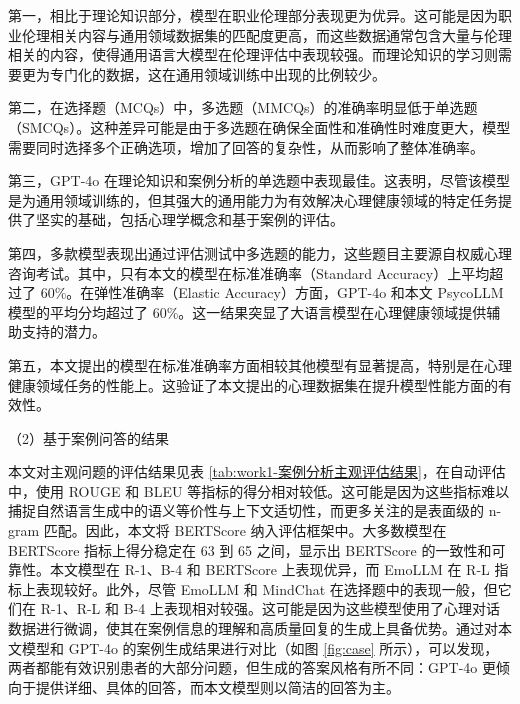 第一，相比于理论知识部分，模型在职业伦理部分表现更为优异。这可能是因为职业伦理相关内容与通用领域数据集的匹配度更高，而这些数据通常包含大量与伦理相关的内容，使得通用语言大模型在伦理评估中表现较强。而理论知识的学习则需要更为专门化的数据，这在通用领域训练中出现的比例较少。

第二，在选择题（MCQs）中，多选题（MMCQs）的准确率明显低于单选题（SMCQs）。这种差异可能是由于多选题在确保全面性和准确性时难度更大，模型需要同时选择多个正确选项，增加了回答的复杂性，从而影响了整体准确率。

第三，GPT-4o 在理论知识和案例分析的单选题中表现最佳。这表明，尽管该模型是为通用领域训练的，但其强大的通用能力为有效解决心理健康领域的特定任务提供了坚实的基础，包括心理学概念和基于案例的评估。

第四，多款模型表现出通过评估测试中多选题的能力，这些题目主要源自权威心理咨询考试。其中，只有本文的模型在标准准确率（Standard Accuracy）上平均超过了 60\%。在弹性准确率（Elastic Accuracy）方面，GPT-4o 和本文 PsycoLLM 模型的平均分均超过了 60\%。这一结果突显了大语言模型在心理健康领域提供辅助支持的潜力。

第五，本文提出的模型在标准准确率方面相较其他模型有显著提高，特别是在心理健康领域任务的性能上。这验证了本文提出的心理数据集在提升模型性能方面的有效性。

（2）基于案例问答的结果

本文对主观问题的评估结果见表 \ref{tab:work1-案例分析主观评估结果}，在自动评估中，使用 ROUGE 和 BLEU 等指标的得分相对较低。这可能是因为这些指标难以捕捉自然语言生成中的语义等价性与上下文适切性，而更多关注的是表面级的 n-gram 匹配。因此，本文将 BERTScore 纳入评估框架中。大多数模型在 BERTScore 指标上得分稳定在 63 到 65 之间，显示出 BERTScore 的一致性和可靠性。本文模型在 R-1、B-4 和 BERTScore 上表现优异，而 EmoLLM 在 R-L 指标上表现较好。此外，尽管 EmoLLM 和 MindChat 在选择题中的表现一般，但它们在 R-1、R-L 和 B-4 上表现相对较强。这可能是因为这些模型使用了心理对话数据进行微调，使其在案例信息的理解和高质量回复的生成上具备优势。通过对本文模型和 GPT-4o 的案例生成结果进行对比（如图 \ref{fig:case} 所示），可以发现，两者都能有效识别患者的大部分问题，但生成的答案风格有所不同：GPT-4o 更倾向于提供详细、具体的回答，而本文模型则以简洁的回答为主。

